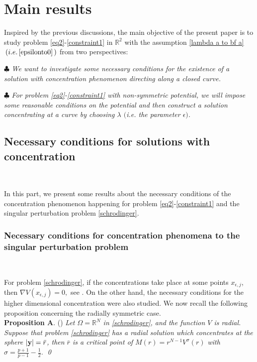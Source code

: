 \documentclass[10pt, reqno]{amsart}
\numberwithin{equation}{section}
\theoremstyle{definition}
\begin{document}

\medskip
\section{Main results}\label{Section2}

\smallskip
Inspired by the previous discussions, the main objective of the present paper is to study problem \eqref{eq2}-\eqref{constraint1} in ${\mathbb R}^2$ with the assumption \eqref{lambda a to bf a} $\,(i.e.\, \eqref{epsilonto0}\,)$ from two perspectives:

\smallskip
\noindent$\clubsuit$
{\emph{
We want to investigate some necessary conditions for the existence of a solution with concentration phenomenon directing along a closed curve.
}}

\smallskip
\noindent$\clubsuit$
{\emph{
For problem \eqref{eq2}-\eqref{constraint1} with non-symmetric potential, we will impose some reasonable conditions on the potential and then construct a solution concentrating at a curve by choosing $\lambda$ $($i.e. the parameter $\epsilon$$)$.
}}

\subsection{ Necessary conditions for solutions with concentration}\label{Section2.2}\

In this part, we present some results about the necessary conditions of the concentration
 phenomenon happening for problem \eqref{eq2}-\eqref{constraint1} and the singular perturbation problem \eqref{schrodinger}.




\subsubsection{Necessary conditions for concentration phenomena to the singular perturbation problem}\

For problem \eqref{schrodinger}, if the concentrations take place at some points $x_{\epsilon, j}$, then $\nabla V (x_{\epsilon, j})=0, $ see \cite{Ambrosetti, AmbMalSecc2001, CPY2019, delPFelmer1996, delPFelmer1997, FloerWein1986}. On the other hand, the necessary conditions for the higher dimensional concentration were also studied.
We now recall the following proposition concerning the radially symmetric case.
\\[2mm]
{\bf Proposition A}. (\cite{AMNconjecture1})
{\em Let $\Omega = {\mathbb R}^N$ in \eqref{schrodinger}, and the function $V$ is radial.
Suppose that problem \eqref{schrodinger} has a radial solution which concentrates at the sphere $|{\bf y}|=\bar r$,
then $\bar r$ is a critical point of $M(r)= r^{N-1} V^\sigma (r)$ with $\sigma = \frac{p+1} {p-1} - \frac 12$.
\qed
}
\end{document}
